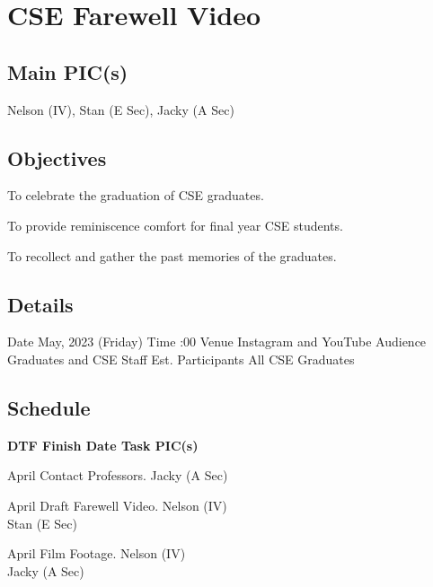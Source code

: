 \section{CSE Farewell Video}

\subsection{Main PIC(s)}
Nelson (IV), Stan (E Sec), Jacky (A Sec)

\subsection{Objectives}
\startitemize
\item To celebrate the graduation of CSE graduates.
\item To provide reminiscence comfort for final year CSE students.
\item To recollect and gather the past memories of the graduates.
\stopitemize

\subsection{Details}
\starttabulate[|rB|l|]
\NC Date
 May, 2023 (Friday) \NR
\NC Time
:00 \NR
\NC Venue
\NC Instagram and YouTube \NR
\NC Audience
\NC Graduates and CSE Staff \NR
\NC Est. Participants
\NC All CSE Graduates \NR
\stoptabulate

\subsection{Schedule}

\setupTABLE[c][1][width=0.75in]
\setupTABLE[c][2][width=1in]
\setupTABLE[c][3][width=3in]
\setupTABLE[c][4][width=1.25in]
\bTABLE
\bTABLEhead

\bTR\bTH    \bf{DTF}
\eTH\bTH    \bf{Finish Date}
\eTH\bTH    \bf{Task}
\eTH\bTH    \bf{PIC(s)}
\eTH\eTR

\eTABLEhead
\bTABLEbody

\bTR{}
\eTD{} April
\eTD\bTD Contact Professors.
\eTD\bTD Jacky (A Sec)
\eTD\eTR

\bTR{}
\eTD{} April
\eTD\bTD Draft Farewell Video.
\eTD\bTD Nelson (IV) \\ Stan (E Sec)
\eTD\eTR

\bTR{}
\eTD{} April
\eTD\bTD Film Footage.
\eTD\bTD Nelson (IV) \\ Jacky (A Sec)
\eTD\eTR

